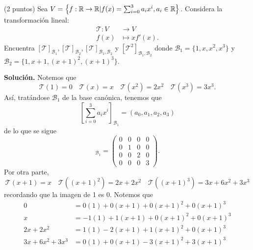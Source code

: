 \documentclass[11pt]{scrartcl}
\begin{document}
\newpage
\begin{mdframed}[style=mdpurplebox, frametitle={Ejercicio 3, Tarea 11, Álgebra Lineal I}]
    (2 puntos) Sea $V = \left\{f:\mathbb R \rightarrow \mathbb R | f(x) = \sum_{i=0}^{3}a_ix^i, a_i \in \mathbb R \right\}$. Considera la transformación lineal:
    \begin{align*}
        \mathcal{T}:V &\rightarrow V \\
        f(x) &\mapsto xf'(x).
    \end{align*}
    Encuentra $[\mathcal{T}]_{\mathcal{B}_1}, [\mathcal{T}]_{\mathcal{B}_2}, [\mathcal{T}]_{\mathcal{B}_1,\mathcal{B}_2}$ y $[\mathcal{T}^2]_{\mathcal{B}_1,\mathcal{B}_2}$
    donde $\mathcal{B}_1 = \{1,x,x^2,x^3\}$ y \\ $\mathcal{B}_2 = \{1,x+1,(x+1)^2,(x+1)^3\}$.
\end{mdframed}
\textbf{Solución.} Notemos que
\begin{equation*}
    \mathcal{T}(1) = 0 \quad
    \mathcal{T}(x) = x \quad
    \mathcal{T}\left(x^2\right) = 2x^2 \quad
    \mathcal{T}\left(x^3\right) = 3x^3. \tag{1}
\end{equation*}
Así, tratándose $\mathcal{B}_1$ de la base canónica, tenemos que
\begin{equation*}
    \left[\sum_{i=0}^{3}a_ix^i\right]_{\mathcal{B}_1} =
    (a_0,a_1,a_2,a_3)
\end{equation*}
de lo que se sigue
\begin{equation*}
    [T]_{\mathcal{B}_1} =
    \begin{pmatrix}
        0 & 0 & 0 & 0 \\
        0 & 1 & 0 & 0 \\
        0 & 0 & 2 & 0 \\
        0 & 0 & 0 & 3
    \end{pmatrix}.
\end{equation*}
Por otra parte,
\begin{equation*}
    \mathcal{T}\left(x+1\right) = x \quad
    \mathcal{T}\left((x+1)^2\right) = 2x + 2x^2 \quad
    \mathcal{T}\left((x+1)^3\right) = 3x+6x^2+3x^3 \tag{2}
\end{equation*}
recordando que la imagen de 1 es 0. Notemos que
\begin{align*}
    0 &= 0(1) + 0(x+1) + 0(x+1)^2 + 0(x+1)^3 \\
    x &= -1(1) + 1(x+1) + 0(x+1)^2 + 0(x+1)^3 \\
    2x+2x^2 &= 1(1) - 2(x+1) + 1(x+1)^2 + 0(x+1)^3 \\
    3x + 6x^2 + 3x^3 &= 0(1) + 0(x+1) - 3(x+1)^2 + 3(x+1)^3
\end{align*}
\end{document}
